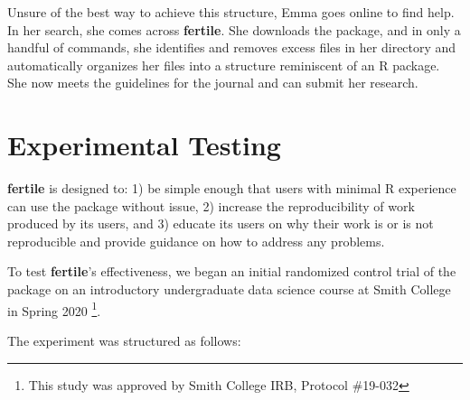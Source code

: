 \documentclass[APA,LATO1COL]{WileyNJD-v2}\usepackage[]{graphicx}\usepackage[]{color}
\newcommand{\R}{\textsf{R}\xspace}
\newcommand{\pkg}[1]{\textbf{#1}}
\begin{document}
Unsure of the best way to achieve this structure, Emma goes online to find help. In her search, she comes across \pkg{fertile}. She downloads the package, and in only a handful of commands, she identifies and removes excess files in her directory and automatically organizes her files into a structure reminiscent of an \R package. She now meets the guidelines for the journal and can submit her research.

\section{Experimental Testing}

\pkg{fertile} is designed to: 1) be simple enough that users with minimal \R experience can use the package without issue, 2) increase the reproducibility of work produced by its users, and 3) educate its users on why their work is or is not reproducible and provide guidance on how to address any problems.

To test \pkg{fertile}'s effectiveness, we began an initial randomized control trial of the package on an introductory undergraduate data science course at Smith College in Spring 2020 \footnote{This study was approved by Smith College IRB, Protocol \#19-032}.

The experiment was structured as follows:
\end{document}
